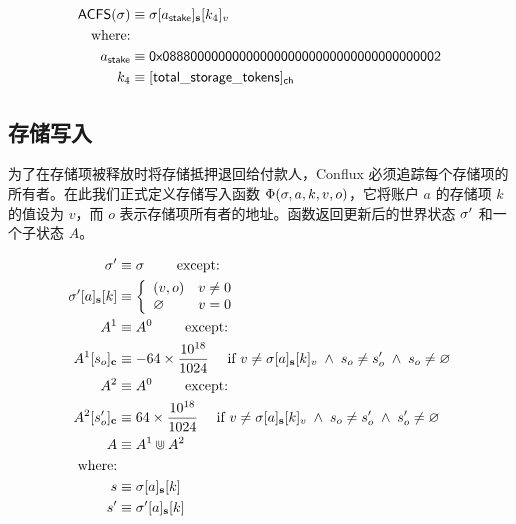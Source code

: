 \begin{align}
	\mathsf{ACFS}(\st) &\eqdef \st[a_{\sf stake}]_{\bf s}[k_4]_v\\
	\mbox{where:} & \\
	a_{\sf stake} &\eqdef \stakingcontract \\ 
	k_4 &\eqdef {\sf [total\char`_storage\char`_tokens]_{\sf ch}} 
\end{align}

\subsection{存储写入}\label{sec:storage_maintain}

为了在存储项被释放时将存储抵押退回给付款人，Conflux 必须追踪每个存储项的所有者。在此我们正式定义存储写入函数 $\Phi(\mathbf{\sigma},a,k,v,o)$，它将账户 $a$ 的存储项 $k$ 的值设为 $v$，而 $o$ 表示存储项所有者的地址。函数返回更新后的世界状态 $\mathbf{\sigma}'$ 和一个子状态 $A$。

\begin{align}
	\mathbf{\sigma}'   &\equiv \mathbf{\sigma} \qquad \mbox{  except:}\\ 
	\mathbf{\sigma}'[a]_{\bf s}[k] &\equiv\left\{
		\begin{array}{ll}
			(v,o) & v\neq 0\\
			\varnothing & v= 0\\
		\end{array}
	\right.\\
	A^1 &\equiv A^0  \qquad \mbox{  except:}\\ 
	A^1[s_o]_{\bf c} &\equiv - 64 \times \frac{10^{18}}{1024} \quad \mbox{ if } v\neq \mathbf{\sigma}[a]_{\bf s}[k]_v \;\wedge\; s_o\neq s'_o \;\wedge\; s_o\neq\varnothing \\ 
	A^2 &\equiv A^0  \qquad \mbox{  except:}\\ 
	A^2[s'_o]_{\bf c} &\equiv 64 \times \frac{10^{18}}{1024} \quad \mbox{ if }v\neq \mathbf{\sigma}[a]_{\bf s}[k]_v \;\wedge\; s_o\neq s'_o \;\wedge\; s'_o\neq\varnothing \\ 
	A &\equiv A^1\Cup A^2 \\
	\text{where:} & \\
	s &\equiv \mathbf{\sigma}[a]_{\bf s}[k] \\
	s' &\equiv \mathbf{\sigma}'[a]_{\bf s}[k] 
\end{align}

